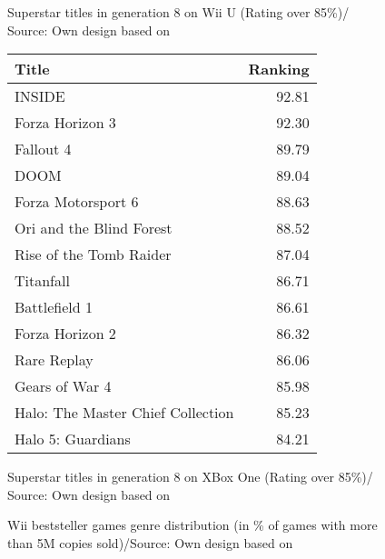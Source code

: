 \documentclass
[
    a4paper,
    11pt
]
{article}
\begin{document}
\begin{appendix}
\begin{figure}
\begin{tabular}{ p{8cm} r}
    \end{tabular}
	\caption{Superstar titles in generation 8 on Wii U (Rating over 85\%)/ Source: Own design based on \cite{Gamerankings2016}}
	\label{tab:wiiusuperstars}
\end{figure}
%
\begin{figure} \centering
 \small
\begin{tabular}{ p{8cm} r}
  \hline
    Title&Ranking \\ \hline \hline
		INSIDE&92.81\\
		Forza Horizon 3&92.30\\
		Fallout 4&	89.79\\
		DOOM&89.04\\
		Forza Motorsport 6&88.63\\
		Ori and the Blind Forest&88.52\\
		Rise of the Tomb Raider&	87.04\\
		Titanfall&86.71\\
		Battlefield 1&86.61\\
		Forza Horizon 2&86.32\\
		Rare Replay&86.06\\
		Gears of War 4&85.98\\
		Halo: The Master Chief Collection&	85.23\\
		Halo 5: Guardians&84.21\\ \hline
    \end{tabular}
	\caption{Superstar titles in generation 8 on XBox One (Rating over 85\%)/ Source: Own design based on \cite{Gamerankings2016}}
	\label{tab:xbonesuperstars}
\end{figure}
%
\begin{figure}[ht!]
    \centering
		\begin{bchart}[step=5,max=55,width=10cm]
      \smallskip
      \smallskip
      \smallskip
      \smallskip
      \smallskip
		\end{bchart}
    \caption{Wii beststeller games genre distribution (in \% of games with more than 5M copies sold)/Source: Own design based on \cite{Vgchartz.com2016}}
    \label{fig:wiibestsellergenres}
\end{figure}
%
\begin{figure}[ht!]
    \centering
		\begin{bchart}[step=5,max=55,width=10cm]

\end{bchart}
\end{figure}
\end{appendix}
\end{document}
